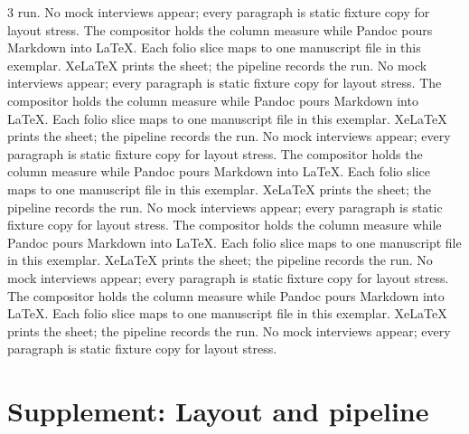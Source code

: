 \documentclass[
]{article}
\begin{document}
\begin{multicols}{3}
run. No mock interviews appear; every paragraph is static fixture copy
for layout stress. The compositor holds the column measure while Pandoc
pours Markdown into LaTeX. Each folio slice maps to one manuscript file
in this exemplar. XeLaTeX prints the sheet; the pipeline records the
run. No mock interviews appear; every paragraph is static fixture copy
for layout stress. The compositor holds the column measure while Pandoc
pours Markdown into LaTeX. Each folio slice maps to one manuscript file
in this exemplar. XeLaTeX prints the sheet; the pipeline records the
run. No mock interviews appear; every paragraph is static fixture copy
for layout stress. The compositor holds the column measure while Pandoc
pours Markdown into LaTeX. Each folio slice maps to one manuscript file
in this exemplar. XeLaTeX prints the sheet; the pipeline records the
run. No mock interviews appear; every paragraph is static fixture copy
for layout stress. The compositor holds the column measure while Pandoc
pours Markdown into LaTeX. Each folio slice maps to one manuscript file
in this exemplar. XeLaTeX prints the sheet; the pipeline records the
run. No mock interviews appear; every paragraph is static fixture copy
for layout stress. The compositor holds the column measure while Pandoc
pours Markdown into LaTeX. Each folio slice maps to one manuscript file
in this exemplar. XeLaTeX prints the sheet; the pipeline records the
run. No mock interviews appear; every paragraph is static fixture copy
for layout stress.

\end{multicols}

\newpage

\section{Supplement: Layout and
pipeline}\label{supplement-layout-and-pipeline}
\end{document}
